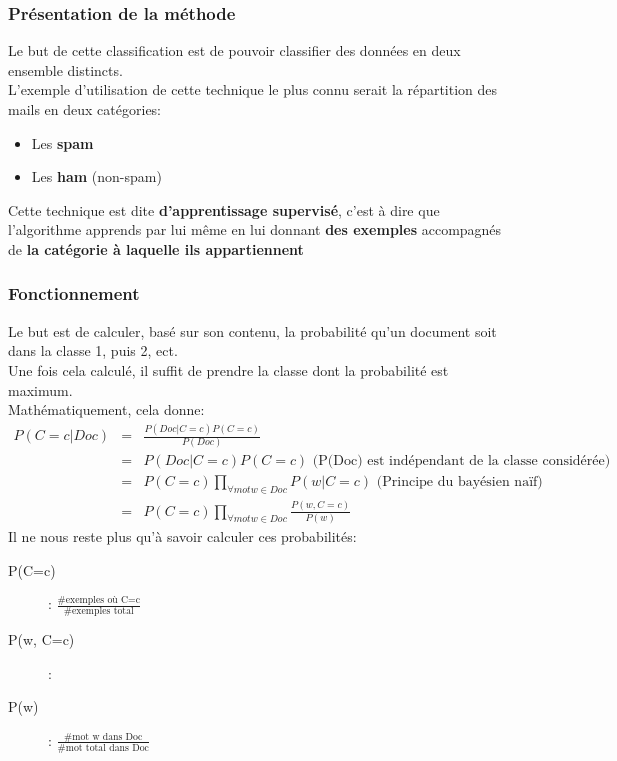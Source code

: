             \subsubsection{Présentation de la méthode}
                Le but de cette classification est de pouvoir classifier des données en deux ensemble distincts.\\
                L'exemple d'utilisation de cette technique le plus connu serait la répartition des mails en deux catégories:
                \begin{itemize}
                    \item Les \textbf{spam}
                    \item Les \textbf{ham} (non-spam)
                \end{itemize}
                Cette technique est dite \textbf{d'apprentissage supervisé}, c'est à dire que l'algorithme apprends par lui même en lui donnant \textbf{des exemples} accompagnés de \textbf{la catégorie à laquelle ils appartiennent}
            \subsubsection{Fonctionnement}
                Le but est de calculer, basé sur son contenu, la probabilité qu'un document soit dans la classe 1, puis 2, ect.\\
                Une fois cela calculé, il suffit de prendre la classe dont la probabilité est maximum.\\
                Mathématiquement, cela donne:
                \[
                    \begin{array}{rcl}
                        P(C=c|Doc) &=& \frac{P(Doc|C=c)P(C=c)}{P(Doc)}\\
                        &=& P(Doc|C=c)P(C=c) \text{ (P(Doc) est indépendant de la classe considérée)} \\
                        &=& P(C=c)\prod_{\forall mot w\in Doc}P(w|C=c)\text{ (Principe du bayésien naïf)}\\
                        &=& P(C=c)\prod_{\forall mot w\in Doc}\frac{P(w, C=c)}{P(w)}
                    \end{array}
                \]
                Il ne nous reste plus qu'à savoir calculer ces probabilités:
                \begin{description}
                    \item[P(C=c)]: $\frac{\text{\# exemples où C=c}}{\text{\# exemples total}}$
                    \item[P(w, C=c)]:  $\frac{\text{}}{\text{}}$%
                    \item[P(w)]: $\frac{\text{\# mot w dans Doc}}{\text{\# mot total dans Doc}}$
                \end{description}
